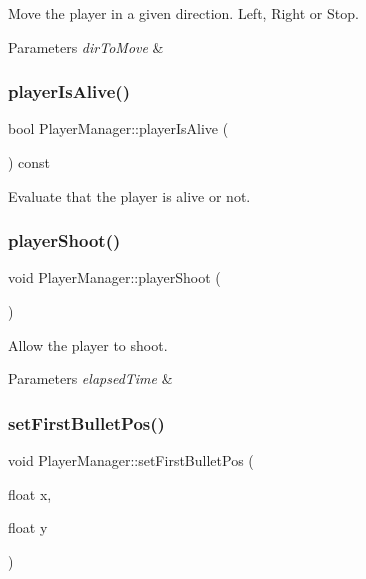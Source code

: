 Move the player in a given direction. Left, Right or Stop. 


\begin{DoxyParams}{Parameters}
{\em dir\+To\+Move} & \\
\hline
\end{DoxyParams}
\mbox{\label{class_player_manager_ab927a10c2c602c42daf2e11eb8861692}} 
\subsubsection{\texorpdfstring{player\+Is\+Alive()}{playerIsAlive()}}
{\footnotesize\ttfamily bool Player\+Manager\+::player\+Is\+Alive (\begin{DoxyParamCaption}{ }\end{DoxyParamCaption}) const}



Evaluate that the player is alive or not. 

\mbox{\label{class_player_manager_a7a61c6484a3dd12293d2481c5f61fb71}} 
\subsubsection{\texorpdfstring{player\+Shoot()}{playerShoot()}}
{\footnotesize\ttfamily void Player\+Manager\+::player\+Shoot (\begin{DoxyParamCaption}{ }\end{DoxyParamCaption})}



Allow the player to shoot. 


\begin{DoxyParams}{Parameters}
{\em elapsed\+Time} & \\
\hline
\end{DoxyParams}
\mbox{\label{class_player_manager_ae654ee04f5d9820cbb4c6b91161cc7a2}} 
\subsubsection{\texorpdfstring{set\+First\+Bullet\+Pos()}{setFirstBulletPos()}}
{\footnotesize\ttfamily void Player\+Manager\+::set\+First\+Bullet\+Pos (\begin{DoxyParamCaption}\item[{float}]{x,  }\item[{float}]{y }\end{DoxyParamCaption})\hspace{0.3cm}{\ttfamily [inline]}}

